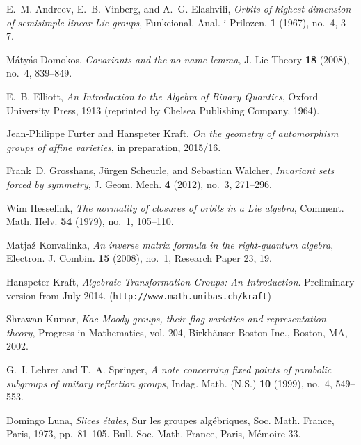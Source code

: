 \documentclass{amsart}
\theoremstyle{definition}
\theoremstyle{remark}
\begin{document}
\begin{thebibliography}{GSW12}

E.~M. Andreev, E.~B. Vinberg, and A.~G. Elashvili, \emph{Orbits of highest
  dimension of semisimple linear {L}ie groups}, Funkcional. Anal. i Prilozen.
  \textbf{1} (1967), no.~4, 3--7.
  
M{{\'a}}ty{{\'a}}s Domokos, \emph{Covariants and the no-name lemma}, J. Lie
  Theory \textbf{18} (2008), no.~4, 839--849.

E.~B. Elliott, \emph{An {I}ntroduction to the {A}lgebra of {B}inary
  {Q}uantics}, Oxford University Press, 1913 (reprinted by Chelsea Publishing
  Company, 1964).

Jean-Philippe Furter and Hanspeter Kraft, \emph{On the geometry of automorphism
groups of affine varieties}, in preparation, 2015/16.

Frank~D. Grosshans, J{{\"u}}rgen Scheurle, and Sebastian Walcher,
  \emph{Invariant sets forced by symmetry}, J. Geom. Mech. \textbf{4} (2012),
  no.~3, 271--296.

Wim Hesselink, \emph{The normality of closures of orbits in a {L}ie algebra},
  Comment. Math. Helv. \textbf{54} (1979), no.~1, 105--110.
  
Matja{\v{z}} Konvalinka, \emph{An inverse matrix formula in the right-quantum
  algebra}, Electron. J. Combin. \textbf{15} (2008), no.~1, Research Paper 23,
  19.
  
Hanspeter Kraft, \emph{Algebraic {T}ransformation {G}roups: {A}n
{I}ntroduction}. Preliminary version from July 2014. ({\tt http://www.math.unibas.ch/kraft})

Shrawan Kumar, \emph{Kac-{M}oody groups, their flag varieties and
  representation theory}, Progress in Mathematics, vol. 204, Birkh{\"a}user
  Boston Inc., Boston, MA, 2002.

G.~I. Lehrer and T.~A. Springer, \emph{A note concerning fixed points of
  parabolic subgroups of unitary reflection groups}, Indag. Math. (N.S.)
  \textbf{10} (1999), no.~4, 549--553.

Domingo Luna, \emph{Slices {\'e}tales}, Sur les groupes alg{\'e}briques, Soc.
  Math. France, Paris, 1973, pp.~81--105. Bull. Soc. Math. France, Paris,
  M{\'e}moire 33.


\end{thebibliography}
\end{document}
